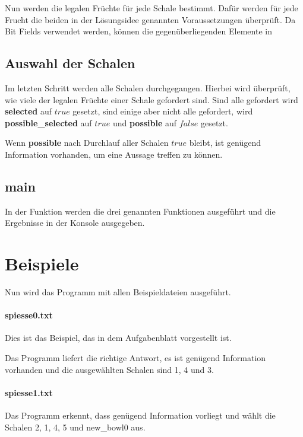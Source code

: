 \documentclass[a4paper,10pt,ngerman]{scrartcl}
\begin{document}
Nun werden die legalen Früchte für jede Schale bestimmt.
Dafür werden für jede Frucht die beiden in der Lösungsidee genannten Voraussetzungen überprüft.
Da Bit Fields verwendet werden, können die gegenüberliegenden Elemente in

\subsection{Auswahl der Schalen}
Im letzten Schritt werden alle Schalen durchgegangen.
Hierbei wird überprüft, wie viele der legalen Früchte einer Schale gefordert sind.
Sind alle gefordert wird \textbf{selected} auf $true$ gesetzt, sind einige aber nicht alle gefordert, wird \textbf{possible\_selected} auf $true$ und \textbf{possible} auf $false$ gesetzt.

Wenn \textbf{possible} nach Durchlauf aller Schalen $true$ bleibt, ist genügend Information vorhanden, um eine Aussage treffen zu können.

\subsection{\textbf{main}}
In der  Funktion werden die drei genannten Funktionen ausgeführt und die Ergebnisse in der Konsole ausgegeben.

\section{Beispiele}
Nun wird das Programm mit allen Beispieldateien ausgeführt.

\paragraph{spiesse0.txt}
Dies ist das Beispiel, das in dem Aufgabenblatt vorgestellt ist.

Das Programm liefert die richtige Antwort, es ist genügend Information vorhanden und die ausgewählten Schalen sind 1, 4 und 3.

\paragraph{spiesse1.txt}
Das Programm erkennt, dass genügend Information vorliegt und wählt die Schalen 2, 1, 4, 5 und new\_bowl0 aus.
\end{document}
